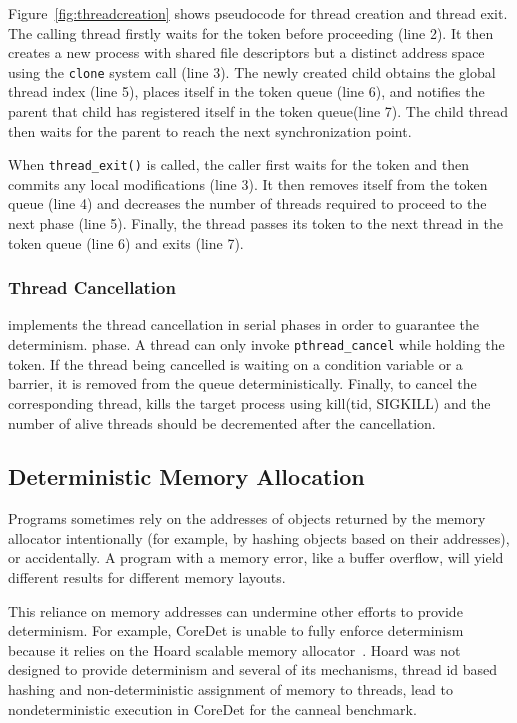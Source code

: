 Figure~\ref{fig:threadcreation} shows pseudocode for thread creation and thread exit. The calling thread firstly waits for the token before proceeding (line 2).  It then creates a new process with shared file descriptors but a distinct address space using the \texttt{clone} system call (line 3).  The newly created child obtains the global thread index (line 5), places itself in the token queue (line 6), and notifies the parent that child has registered itself in the token queue(line 7). The child thread then waits for the parent to reach the next synchronization point. 

When \texttt{thread\_exit()} is called, the caller first waits for the token and then commits any local modifications (line 3). It then removes itself from the token queue (line 4) and decreases the number of threads required to proceed to the next phase (line 5). Finally, the thread passes its token to the next thread in the token queue (line 6) and exits (line 7).

\subsubsection{Thread Cancellation}

\dthreads{} implements the thread cancellation in serial phases in order to guarantee the determinism. phase. A thread can only invoke \texttt{pthread\_cancel} while holding the token. If the thread being cancelled is waiting on a condition variable or a barrier, it is removed from the queue deterministically. Finally, to cancel the corresponding thread, \dthreads{} kills the target process using kill(tid, SIGKILL) and the number of alive threads should be decremented after the cancellation.

\subsection{Deterministic Memory Allocation}
Programs sometimes rely on the addresses of objects returned by the memory allocator intentionally (for example, by hashing objects based on their addresses), or accidentally. A program with a memory error, like a buffer overflow, will yield different results for different memory layouts.

This reliance on memory addresses can undermine other efforts to provide determinism. For example, CoreDet is unable to fully enforce determinism because it relies on the Hoard scalable memory allocator~\cite{Bergan:2010:CCR:1736020.1736029}. Hoard was not designed to provide determinism and several of its mechanisms, thread id based hashing and non-deterministic assignment of memory to threads, lead to nondeterministic execution in CoreDet for the canneal benchmark.


